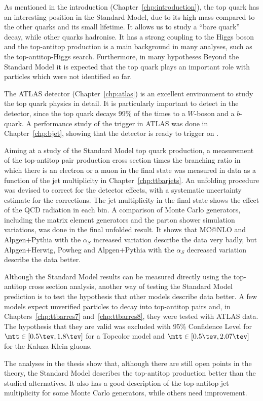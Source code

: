 
As mentioned in the introduction (Chapter~\ref{chp:introduction}), the top quark has an interesting position in the
Standard Model, due to its high mass compared to the other quarks and its small lifetime. It allows us to study a ``bare quark'' decay,
while other quarks hadronise. It has a strong coupling to the Higgs boson and the top-antitop production is a main background in many analyses,
such as the top-antitop-Higgs search. Furthermore, in many hypotheses Beyond the Standard Model it is expected that the top quark plays an important role with
particles which were not identified so far.

The ATLAS detector (Chapter~\ref{chp:atlas}) is an excellent environment to study the top quark physics
in detail. It is particularly important to detect \bjets in the detector, since the top quark decays 99\% of the times to a $W$-boson
and a $b$-quark. A performance study of the \bjet trigger in ATLAS was done in Chapter~\ref{chp:bjet}, showing that the detector is
ready to trigger on \bjets.

Aiming at a study of the Standard Model top quark production, a measurement of the top-antitop pair production cross section times the branching ratio in which
there is an electron or a muon in the final state was measured in data as a function of the jet multiplicity in Chapter~\ref{chp:ttbarjets}.
An unfolding procedure was devised to correct for the detector effects, with a systematic uncertainty estimate for the corrections.
The jet multiplicity in the final state
shows the effect of the QCD radiation in each bin. A comparison of Monte Carlo generators, including the matrix element generators and the parton shower simulation variations,
was done in the final unfolded result. It shows that MC@NLO and Alpgen+Pythia with the $\alpha_S$ increased variation describe the data very badly, but
Alpgen+Herwig, Powheg and Alpgen+Pythia with the $\alpha_S$ decreased variation describe the data better.

Although the Standard Model results can be measured directly using the top-antitop cross section analysis, another way of testing the Standard Model prediction
is to test the hypothesis that other models describe data better. A few models expect unverified particles to decay into top-antitop pairs and, in
Chapters~\ref{chp:ttbarres7} and~\ref{chp:ttbarres8},
they were tested with ATLAS data. The hypothesis that they are valid was excluded with 95\% Confidence Level for $\mtt \in [0.5\tev, 1.8\tev]$ for a Topcolor \zprime model
and $\mtt \in [0.5\tev, 2.07\tev]$ for the Kaluza-Klein gluons.

The analyses in the thesis show that, although there are still open points in the theory, the Standard Model describes the top-antitop production better than
the studied alternatives. It also has a good description of the top-antitop jet multiplicity for some Monte Carlo generators, while others need improvement.
